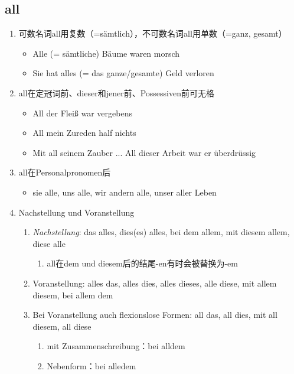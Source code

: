 \documentclass[UTF8]{report}
\begin{document}
\subsection{all}
\begin{enumerate}
    \item 可数名词all用复数（=sämtlich），不可数名词all用单数（=ganz, gesamt）
    \begin{itemize}
        \item Alle (= sämtliche) Bäume waren morsch
        \item Sie hat alles (= das ganze/gesamte) Geld verloren
    \end{itemize}
    \item all在定冠词前、dieser和jener前、Possessiven前可无格
    \begin{itemize}
        \item All der Fleiß war vergebens
        \item All mein Zureden half nichts
        \item  Mit all seinem Zauber ... All dieser Arbeit war er überdrüssig
    \end{itemize}
    \item all在Personalpronomen后
    \begin{itemize}
        \item sie alle, uns alle, wir andern alle, unser aller Leben
    \end{itemize}
    \item Nachstellung und Voranstellung
    \begin{enumerate}
        \item \emph{Nachstellung}: das alles, dies(es) alles, bei dem allem, mit diesem allem, diese alle
        \begin{enumerate}
            \item all在dem und diesem后的结尾-en有时会被替换为-em
        \end{enumerate}
        \item Voranstellung: alles das, alles dies, alles dieses, alle diese, mit allem diesem, bei allem dem
        \item Bei Voranstellung auch flexionslose Formen: all das, all dies, mit all diesem, all diese
        \begin{enumerate}
            \item  mit Zusammenschreibung：bei alldem
            \item Nebenform：bei alledem
        \end{enumerate}
    \end{enumerate}
\end{enumerate}
\end{document}
